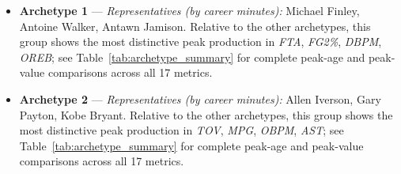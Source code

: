 \begin{itemize}
\item \textbf{Archetype 1} --- \emph{Representatives (by career minutes):} Michael Finley, Antoine Walker, Antawn Jamison. Relative to the other archetypes, this group shows the most distinctive peak production in \textit{FTA}, \textit{FG2\%}, \textit{DBPM}, \textit{OREB}; see Table~\ref{tab:archetype_summary} for complete peak-age and peak-value comparisons across all 17 metrics.
\item \textbf{Archetype 2} --- \emph{Representatives (by career minutes):} Allen Iverson, Gary Payton, Kobe Bryant. Relative to the other archetypes, this group shows the most distinctive peak production in \textit{TOV}, \textit{MPG}, \textit{OBPM}, \textit{AST}; see Table~\ref{tab:archetype_summary} for complete peak-age and peak-value comparisons across all 17 metrics.
\end{itemize}
